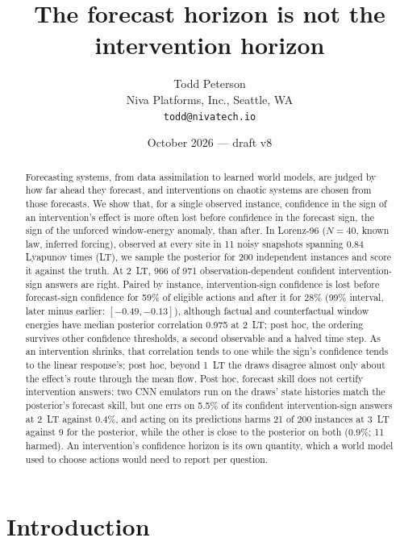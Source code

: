 \documentclass[11pt]{article}
\title{The forecast horizon is not the intervention horizon}
\author{Todd Peterson\\
Niva Platforms, Inc., Seattle, WA\\
\texttt{todd@nivatech.io}}
\date{October 2026 --- draft v8}
\begin{document}
\maketitle

\begin{abstract}
Forecasting systems, from data assimilation to learned world models, are judged by how far ahead they forecast, and interventions on chaotic systems are chosen from those forecasts. We show that, for a single observed instance, confidence in the sign of an intervention's effect is more often lost before confidence in the forecast sign, the sign of the unforced window-energy anomaly, than after. In Lorenz-96 ($N = 40$, known law, inferred forcing), observed at every site in 11 noisy snapshots spanning 0.84 Lyapunov times (LT), we sample the posterior for 200 independent instances and score it against the truth. At 2~LT, 966 of 971 observation-dependent confident intervention-sign answers are right. Paired by instance, intervention-sign confidence is lost before forecast-sign confidence for 59\% of eligible actions and after it for 28\% (99\% interval, later minus earlier: $[-0.49, -0.13]$), although factual and counterfactual window energies have median posterior correlation 0.975 at 2~LT; post hoc, the ordering survives other confidence thresholds, a second observable and a halved time step. As an intervention shrinks, that correlation tends to one while the sign's confidence tends to the linear response's; post hoc, beyond 1~LT the draws disagree almost only about the effect's route through the mean flow. Post hoc, forecast skill does not certify intervention answers: two CNN emulators run on the draws' state histories match the posterior's forecast skill, but one errs on 5.5\% of its confident intervention-sign answers at 2~LT against 0.4\%, and acting on its predictions harms 21 of 200 instances at 3~LT against 9 for the posterior, while the other is close to the posterior on both (0.9\%; 11 harmed). An intervention's confidence horizon is its own quantity, which a world model used to choose actions would need to report per question.
\end{abstract}

\section{Introduction}
\end{document}
